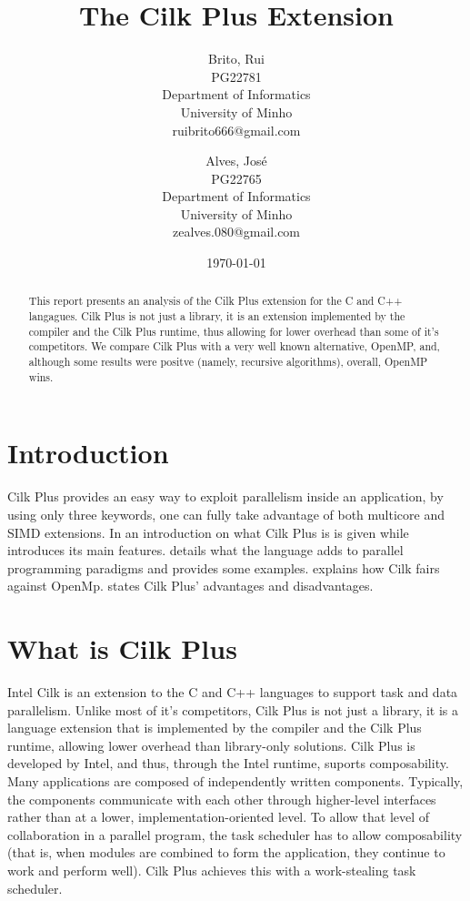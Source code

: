 \documentclass[a4paper,10pt,openright,openbib,twocolumn]{article}
\begin{document}
\title{The Cilk Plus Extension}
\date{\today}
\begin{multicols}{2}
\author{
    Brito, Rui\\
    PG22781\\
    Department of Informatics\\
    University of Minho\\
    ruibrito666@gmail.com
  \and
    Alves, José\\
    PG22765\\
    Department of Informatics\\
    University of Minho\\
    zealves.080@gmail.com
}
\date{}
\maketitle
\end{multicols}

\begin{abstract}
    This report presents an analysis of the Cilk Plus extension for the C and C++ langagues. Cilk Plus is not just a library, it is an extension implemented by the compiler and the Cilk Plus runtime, thus allowing for lower overhead than some of it's competitors. We compare Cilk Plus with a very well known alternative, OpenMP, and, although some results were positve (namely, recursive algorithms), overall, OpenMP wins. 
\end{abstract}

\section{Introduction}   
    Cilk Plus provides an easy way to exploit parallelism inside an application, by using only three keywords, one can fully take advantage of both multicore and SIMD extensions. In  an introduction on what Cilk Plus is is given while  introduces its main features.  details what the language adds to parallel programming paradigms and provides some examples.  explains how Cilk fairs against OpenMp.  states Cilk Plus' advantages and disadvantages.


\section{What is Cilk Plus} \label{cilk}
Intel Cilk is an extension to the C and C++ languages to support task and data parallelism. Unlike most of it's competitors, Cilk Plus is not just a library, it is a language extension that is implemented by the compiler and the Cilk Plus runtime, allowing lower overhead than library-only solutions. Cilk Plus is developed by Intel, and thus, through the Intel runtime, suports composability. Many applications are composed of independently written components. Typically, the components communicate with each other through higher-level interfaces rather than at a lower, implementation-oriented level. To allow that level of collaboration in a parallel program, the task scheduler has to allow composability (that is, when modules are combined to form the application, they continue to work and perform well). Cilk Plus achieves this with a work-stealing task scheduler.
\end{document}
